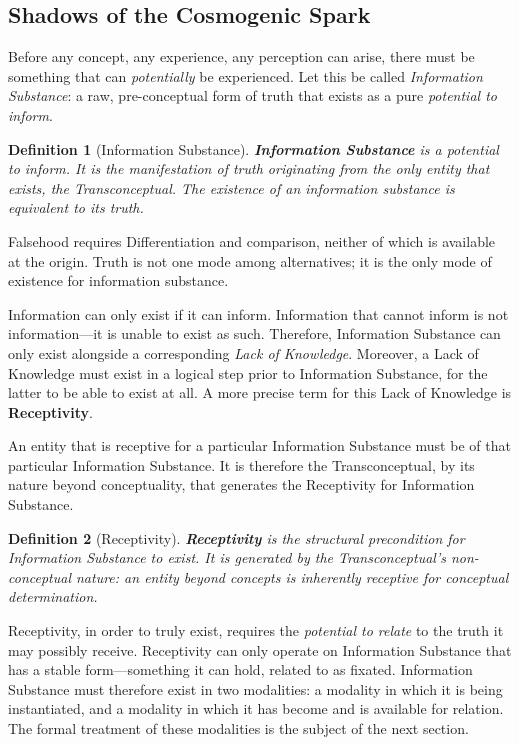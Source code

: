 \documentclass[11pt, a4paper]{article}
\theoremstyle{formalism}
\newtheorem{formalism}{Definition}
\begin{document}
\subsection{Shadows of the Cosmogenic Spark}

Before any concept, any experience, any perception can arise, there must be
something that can \textit{potentially} be experienced. Let this be called
\textit{Information Substance}: a raw, pre-conceptual form of truth that exists
as a pure \textit{potential to inform}.

\begin{formalism}[Information Substance]
    \textbf{Information Substance} is a potential to inform. It is the 
    manifestation of truth originating from the only entity that exists, 
    the Transconceptual. The existence of an information substance is
    equivalent to its truth.
\end{formalism}

Falsehood requires Differentiation and comparison, neither of which is
available at the origin. Truth is not one mode among alternatives; it is the
only mode of existence for information substance.

Information can only exist if it can inform. Information that cannot inform is
not information---it is unable to exist as such. Therefore, Information
Substance can only exist alongside a corresponding \textit{Lack of Knowledge}.
Moreover, a Lack of Knowledge must exist in a logical step prior to Information
Substance, for the latter to be able to exist at all. A more precise term for
this Lack of Knowledge is \textbf{Receptivity}.

An entity that is receptive for a particular Information Substance must be of
that particular Information Substance. It is therefore the Transconceptual, by
its nature beyond conceptuality, that generates the Receptivity for Information
Substance.

\begin{formalism}[Receptivity]
    \textbf{Receptivity} is the structural precondition for Information
    Substance to exist. It is generated by the Transconceptual's non-conceptual
    nature: an entity beyond concepts is inherently receptive for conceptual
    determination.
\end{formalism}

Receptivity, in order to truly exist, requires the \textit{potential to
relate} to the truth it may possibly receive. Receptivity can only operate on
Information Substance that has a stable form---something it can hold, related
to as fixated. Information Substance must therefore exist in two modalities:
a modality in which it is being instantiated, and a modality in which it has
become and is available for relation. The formal treatment of these
modalities is the subject of the next section.
\end{document}
